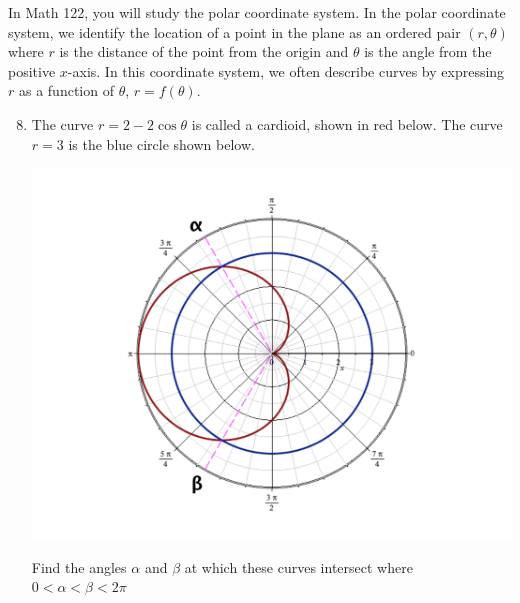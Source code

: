 \documentclass[12pt]{article}
\newif\ifans
\begin{document}
In Math 122, you will study the polar coordinate system.  In the polar coordinate system, we identify the location of a point in the plane as an ordered pair $(r,\theta)$ where $r$ is the distance of the point from the origin and $\theta$ is the angle from the positive $x$-axis.  In this coordinate system, we often describe curves by expressing $r$ as a function of $\theta$, $r=f(\theta)$.

\begin{enumerate}
\setcounter{enumi}{7}


\item The curve $r=2-2\cos\theta$ is called a cardioid, shown in red below.  The curve $r=3$ is the blue circle shown below.
\begin{center}
\includegraphics[scale=0.3]{cardioid.pdf}
\end{center}

Find the angles $\alpha$ and $\beta$ at which these curves intersect where $0<\alpha<\beta< 2\pi$

\ifans\fbox{$\alpha=\frac{2\pi}{3}$ and $\beta=\frac{4\pi}{3}$} \fi


\end{enumerate}
\end{document}
